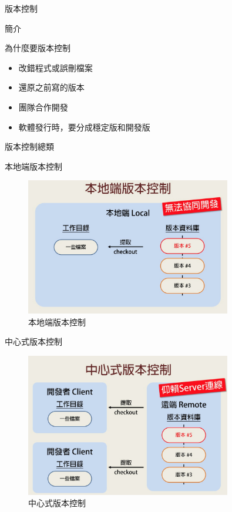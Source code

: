 \documentclass[pdf,15pt]{beamer}
\begin{document}
  \begin{section}{版本控制}
    \begin{subsection}{簡介}
      \begin{frame}{為什麼要版本控制}
        \begin{itemize}
          \item 改錯程式或誤刪檔案
          \item 還原之前寫的版本
          \item 團隊合作開發
          \item 軟體發行時，要分成穩定版和開發版
        \end{itemize}
      \end{frame}
    \end{subsection}
    
    \begin{subsection}{版本控制總類}
      \begin{frame}{本地端版本控制}
        \begin{figure}[h!]
          \includegraphics[width=0.8\textwidth]{images/001.jpg} 
          \caption{本地端版本控制}
        \end{figure}
      \end{frame}
      
      \begin{frame}{中心式版本控制}
        \begin{figure}[h!]
          \includegraphics[width=0.8\textwidth]{images/002.jpg} 
          \caption{中心式版本控制}
        \end{figure}
      \end{frame}
      

\end{subsection}
\end{section}
\end{document}
